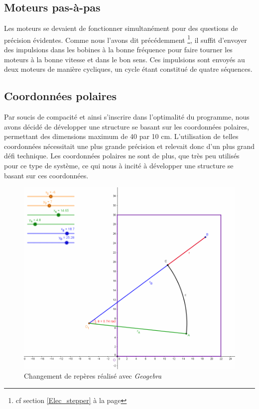 \documentclass[12pt,a4paper]{report}
\begin{document}
\subsection*{Moteurs pas-à-pas}
Les moteurs se devaient de fonctionner simultanément pour des questions de précision évidentes. Comme nous l'avons dit précédemment \footnote{cf section \ref{Elec_stepper} à la page \pageref{Elec_stepper}}, il suffit d'envoyer des impulsions dans les bobines à la bonne fréquence pour faire tourner les moteurs à la bonne vitesse et dans le bon sens. Ces impulsions sont envoyés au deux moteurs de manière cycliques, un cycle étant constitué de quatre séquences. 

\subsection*{Coordonnées polaires}
Par soucis de compacité et ainsi s'inscrire dans l'optimalité du programme, nous avons décidé de développer une structure se basant sur les coordonnées polaires, permettant des dimensions maximum de 40 par 10 cm. L'utilisation de telles coordonnées nécessitait une plus grande précision et relevait donc d'un plus grand défi technique. Les coordonnées polaires ne sont de plus, que très peu utilisés pour ce type de système, ce qui nous à incité à développer une structure se basant sur ces coordonnées.
\begin{figure}[!h]
 \center
 \includegraphics[scale=0.5]{../pictures/Changement_repere}
 \caption{Changement de repères réalisé avec \emph{Geogebra}}
\end{figure}
\end{document}
